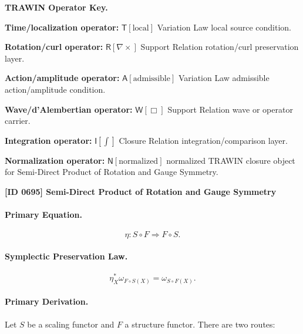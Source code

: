 \par\vspace{0.45\baselineskip}
\noindent\begin{minipage}[t]{\linewidth}
\begingroup
\small
\raggedright
\textbf{TRAWIN Operator Key.}\par
\noindent\textbf{Time/localization operator:} $\mathsf{T}\!\left[\mathrm{local}\right]$ Variation Law local source condition.\par
\noindent\textbf{Rotation/curl operator:} $\mathsf{R}\!\left[\nabla\times\right]$ Support Relation rotation/curl preservation layer.\par
\noindent\textbf{Action/amplitude operator:} $\mathsf{A}\!\left[\mathrm{admissible}\right]$ Variation Law admissible action/amplitude condition.\par
\noindent\textbf{Wave/d'Alembertian operator:} $\mathsf{W}\!\left[\Box\right]$ Support Relation wave or operator carrier.\par
\noindent\textbf{Integration operator:} $\mathsf{I}\!\left[\int\right]$ Closure Relation integration/comparison layer.\par
\noindent\textbf{Normalization operator:} $\mathsf{N}\!\left[\mathrm{normalized}\right]$ normalized TRAWIN closure object for Semi-Direct Product of Rotation and Gauge Symmetry.\par
\endgroup
\end{minipage}

\clearpage
\noindent\textbf{[ID 0695] Semi-Direct Product of Rotation and Gauge Symmetry}\par
\vspace{0.35em}
\paragraph{Primary Equation.}
\begin{equation}
\eta:S\circ F\Rightarrow F\circ S.
\end{equation}

\paragraph{Symplectic Preservation Law.}
\begin{equation}
\eta_X^{*}\omega_{F\circ S(X)}
=
\omega_{S\circ F(X)}.
\end{equation}

\paragraph{Primary Derivation.}
Let $S$ be a scaling functor and $F$ a structure functor.  
There are two routes:

